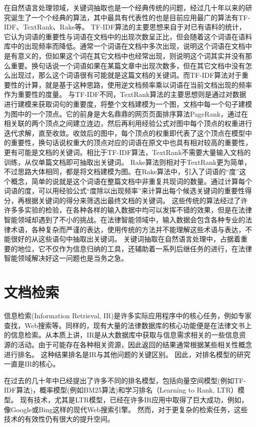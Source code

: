 在自然语言处理领域，关键词抽取也是一个经典传统的问题，经过几十年以来的研究诞生了一个个经典的算法，其中最具有代表性的也是目前应用最广的算法有TF-IDF、TextRank、Rake等。
TF-IDF算法的主要思想来自于对已有语料的统计，它认为词语的重要性与词语在文档中的出现次数呈正比，但会随着这个词语在语料库中的出现频率而降低。通常一个词语在文档中多次出现，说明这个词语在文档中是有意义的，但如果这个词在其它文档中也经常出现，则说明这个词其实并没有那么重要。换句话说一个词语如果在某篇文章中出现次数多，但在其它文档中没有怎么出现过，那么这个词语很有可能就是这篇文档的关键词。而TF-IDF算法对于重要性的计算，就是基于这种思路，使用逆文档频率乘以词语在当前文档出现的频率作为重要性的度量。
与TF-IDF不同，TextRank算法的主要思想则是通过对数据进行建模来获取词句的重要度，将整个文档建模为一个图，文档中每一个句子建模为图中的一个顶点。它的前身是大名鼎鼎的网页页面排序算法PageRank，通过在相关联的两个顶点之间建立连边，然后再利用经验公式对图中每个顶点的权重进行迭代求解，直至收敛。收敛后的图中，每个顶点的权重即代表了这个顶点在模型中的重要性，换句话说权重大的顶点对应的词语在原文中也具有相对较高的重要性，更有可能是文档的关键词。相比于TF-IDF算法，TextRank不需要大量输入文档的训练，从仅单篇文档即可抽取出关键词。
Rake算法则相对于TextRank更为简单，不过思路大体相同，都是将文档建模为图。在Rake算法中，引入了词语的“度”这个概念，简单的说就是这个词语在整篇文档中非重复共现词的数量。通过计算每个词语的度，可以用经验公式“度除以出现频率”来计算出每个候选关键词的重要性得分，再根据关键词的得分来筛选出最终文档的关键词。
这些传统的算法经过了许许多多实验的检验，在各种各样的输入数据中均可以发挥不错的效果，但是在法律智能领域却遇到了不小的挑战。在法律智能领域中，输入数据会包含各种专业的法律术语，各种复杂而严谨的表达，使用传统的方法并不能理解这些术语与表达，不能很好的从这些语句中抽取出关键词。
关键词抽取在自然语言处理中，占据着重要的地位，它不仅作为信息归纳的工具，还辅助着一系列后继任务的进行，在法律智能领域解决好这一问题也是当务之急。


\section{文档检索}
信息检索(Information Retrieval, IR)是许多实际应用程序中的核心任务，例如专家查找，Web搜索等。同样的，现有大量的法律数据库的核心功能便是在法律文书上的信息检索。从本质上讲，IR是从大数据库中获取与信息需求相关的一些信息资源的活动。由于可能存在各种相关资源，因此返回的结果通常根据某些相关性概念进行排名。 这种结果排名是IR与其他问题的关键区别。 因此，对排名模型的研究一直是IR的核心。

在过去的几十年中已经提出了许多不同的排名模型，包括向量空间模型(例如TF-IDF算法)\cite{salton1975vector}，概率模型(例如BM25算法)\cite{robertson1976relevance}和学习排名（Learning to Rank, LTR）模型\cite{liu2009learning,li2011learning}。 现有技术，尤其是LTR模型，已经在许多IR应用中取得了巨大成功，例如，像Google或Bing这样的现代Web搜索引擎。 然而，对于更复杂的检索任务，这些技术的有效性仍有很大的提升空间。

